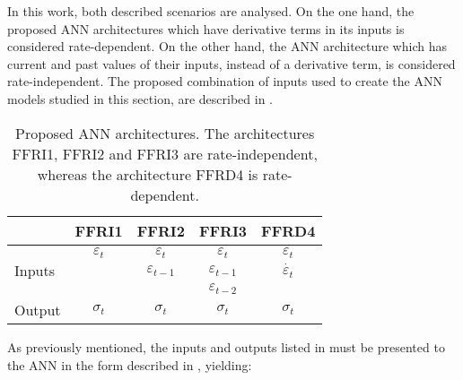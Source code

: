 In this work, both described scenarios are analysed. On the one hand, the proposed ANN architectures which have derivative terms in its inputs is considered rate-dependent. On the other hand, the ANN architecture which has current and past values of their inputs, instead of a derivative term, is considered rate-independent. The proposed combination of inputs used to create the ANN models studied in this section, are described in .

\begin{table}[htbp!]
    \centering
    \caption{Proposed ANN architectures. The architectures FFRI1, FFRI2 and FFRI3 are rate-independent, whereas the architecture FFRD4 is rate-dependent.}
    \begin{tabular}{lcccc}
    \toprule
                            & FFRI1               & FFRI2                   & FFRI3                   & FFRD4\\
    \hline
    \multirow{3}{*}{Inputs} & $\varepsilon_t$   & $\varepsilon_t$       & $\varepsilon_t$       & $\varepsilon_t$       \\
                            &                   & $\varepsilon_{t-1}$   & $\varepsilon_{t-1}$   & $\Dot{\varepsilon_t}$ \\
                            &                   &                       & $\varepsilon_{t-2}$   &                       \\
    \hline
    Output                  & $\sigma_t$        & $\sigma_t$            & $\sigma_t$            & $\sigma_t$            \\
    \bottomrule
    \end{tabular}
    \label{tbl:ANNArchitectures}
\end{table}

As previously mentioned, the inputs and outputs listed in  must be presented to the ANN in the form described in , yielding:

